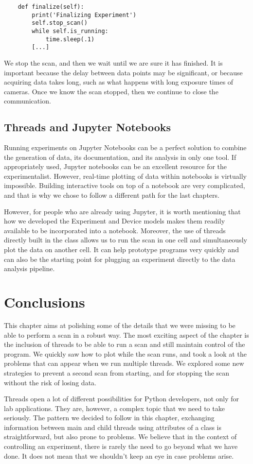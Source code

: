\begin{verbatim}
    def finalize(self):
        print('Finalizing Experiment')
        self.stop_scan()
        while self.is_running:
            time.sleep(.1)
        [...]
\end{verbatim}

We stop the scan, and then we wait until we are sure it has finished. It is important because the delay between data points may be significant, or because acquiring data takes long, such as what happens with long exposure times of cameras. Once we know the scan stopped, then we continue to close the communication.

\subsection{Threads and Jupyter Notebooks}\label{subsection:Jupyter}
Running experiments on Jupyter Notebooks can be a perfect solution to combine the generation of data, its documentation, and its analysis in only one tool. If appropriately used, Jupyter notebooks can be an excellent resource for the experimentalist. However, real-time plotting of data within notebooks is virtually impossible. Building interactive tools on top of a notebook are very complicated, and that is why we chose to follow a different path for the last chapters.

However, for people who are already using Jupyter, it is worth mentioning that how we developed the Experiment and Device models makes them readily available to be incorporated into a notebook. Moreover, the use of threads directly built in the class allows us to run the scan in one cell and simultaneously plot the data on another cell. It can help prototype programs very quickly and can also be the starting point for plugging an experiment directly to the data analysis pipeline.

\section{Conclusions}\label{section:conclusions-run-experiment}
This chapter aims at polishing some of the details that we were missing to be able to perform a scan in a robust way. The most exciting aspect of the chapter is the inclusion of threads to be able to run a scan and still maintain control of the program. We quickly saw how to plot while the scan runs, and took a look at the problems that can appear when we run multiple threads. We explored some new strategies to prevent a second scan from starting, and for stopping the scan without the risk of losing data.

Threads open a lot of different possibilities for Python developers, not only for lab applications. They are, however, a complex topic that we need to take seriously. The pattern we decided to follow in this chapter, exchanging information between main and child threads using attributes of a class is straightforward, but also prone to problems. We believe that in the context of controlling an experiment, there is rarely the need to go beyond what we have done. It does not mean that we shouldn't keep an eye in case problems arise.
